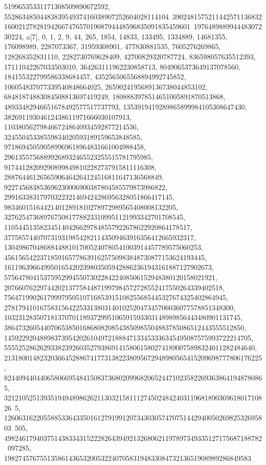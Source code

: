 {{{51996535331171308509890672592, 5528634850448383954937416038907252604028114104\
39024815752114425711368321600212782819426674765701908794448596835091835459601\
197648988994448307230224}}, {a[7], {0, 1, 2, 9, 44, 265, 1854, 14833, 133495, 
   1334889, 14681355, 176098989, 2287073367, 31959308901, 477830881535, 
   7605276269865, 128268352831110, 2282730769628409, 42700829320787724, 
   836598057635512393, 17111042267033503010, 364263111962230858713, 
   8049065373649137078560, 184155322799586338684457, 
   4352565065568894992745852, 106054837077339540848664025, 
   2659024195689136738044853102, 68481874883084508813697419249, 
   1808883978514651005891870513868, 48933482946651678492577517737793, 
   1353919419289865899984105308647430, 38269119304612438611971666030107913, 
   1103805627984667248640934592877214536, 
   32455045338559834020593189159653848585, 
   971869450590589969618964831661004988458, 
   29613557568899268932465523255515781795985, 
   917441282092908998498102282737915811116308, 
   28876446126565906464264124516811647136568849, 
   922745683853696230006900387804585579873986822, 
   29916338317970322321469424286956328051866417145, 
   983460151644214012891810278972989565408008132205, 
   32762547368976750817788233109951121993342701708545, 
   1105445135823451404266297848557922678622920864178517, 
   37758574407073193198542821143509463916356412665932317, 
   1304986704868844881017005240780541003914457789575060253, 
   45615654223718591657786391625750983848730877153624193445, 
   1611963966499501654202398035059428862361943161887127902673, 
   57564780415375952994550730228422408506152948380120158021921, 
   2076607622974420213775844871997984572728552417550264339402518, 
   75647199026179997950510716853915108255685445327674325402864945, 
   2781794101675831564225331380314010252047345706036077578851348300, 
   103231283507181370701189372995106591593303148989856443480901131745, 
   3864732605440706538501686808208543850985504883785086512443555512850, 
   145922920488983739542026104972188847133453336345495087575993722214705, 
   5555252862629338239260352793869141580615802741890075898324011282484640, 
   213180014823203664528867417731382238095672948980565415209698777806176225, 
   8244094404406580669548415083736802099682065244710235822693638641948780865, 
   32121052513935194948986262113032158111274502484240311968189036961801710826\
5, 
   12606316220558853364335016127919912073430305747075144294005026982532695803\
505, 498246179403751438334315222826439492132680621197897349335127175687188782\
097285, 198274576755135861436532005322407058319483308473213651908989286849583\
}}}
